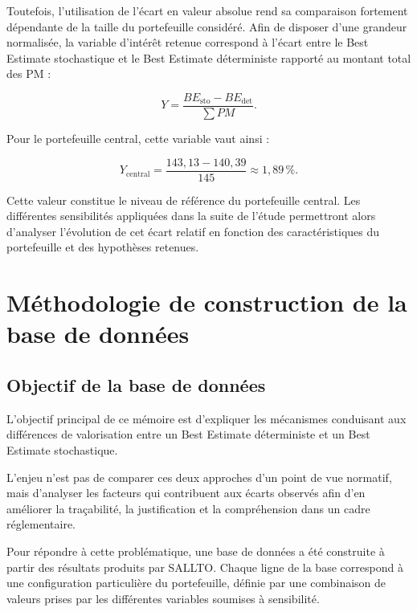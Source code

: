 Toutefois, l'utilisation de l'écart en valeur absolue rend sa comparaison fortement dépendante de la taille du portefeuille considéré. Afin de disposer d'une grandeur normalisée, la variable d'intérêt retenue correspond à l'écart entre le Best Estimate stochastique et le Best Estimate déterministe rapporté au montant total des PM :

\begin{equation}
    Y =
    \frac{BE_{\mathrm{sto}}-BE_{\mathrm{det}}}
    {\sum PM}.
    \label{eq:variable_cible}
\end{equation}

Pour le portefeuille central, cette variable vaut ainsi :

\begin{equation}
    Y_{\mathrm{central}}
    =
    \frac{143{,}13 - 140{,}39}{145}
    \approx 1{,}89\,\%.
\end{equation}

Cette valeur constitue le niveau de référence du portefeuille central. Les différentes sensibilités appliquées dans la suite de l'étude permettront alors d'analyser l'évolution de cet écart relatif en fonction des caractéristiques du portefeuille et des hypothèses retenues.

\section{Méthodologie de construction de la base de données}

\subsection{Objectif de la base de données}

L'objectif principal de ce mémoire est d'expliquer les mécanismes conduisant aux différences de valorisation entre un Best Estimate déterministe et un Best Estimate stochastique.

L'enjeu n'est pas de comparer ces deux approches d'un point de vue normatif, mais d'analyser les facteurs qui contribuent aux écarts observés afin d'en améliorer la traçabilité, la justification et la compréhension dans un cadre réglementaire.

Pour répondre à cette problématique, une base de données a été construite à partir des résultats produits par SALLTO. Chaque ligne de la base correspond à une configuration particulière du portefeuille, définie par une combinaison de valeurs prises par les différentes variables soumises à sensibilité.


